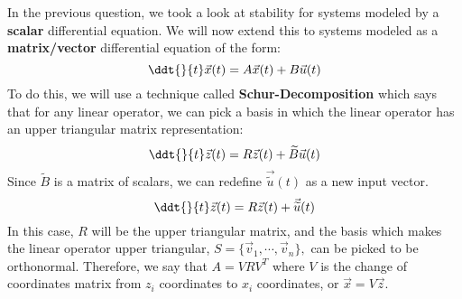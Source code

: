 

In the previous question, we took a look at stability for systems modeled by a \textbf{scalar} differential equation. 
We will now extend this to systems modeled as a \textbf{matrix/vector} differential equation of the form:
\begin{equation}\label{eqn:std}
  \ddt{}{t} \vec{x}(t) = A \vec{x}(t) + B \vec{u}(t)
\end{equation}
To do this, we will use a technique called \textbf{Schur-Decomposition} which says that for any linear operator, we can pick a basis in which the linear operator has an upper triangular matrix representation:
\begin{equation}\label{eqn:schur}
  \ddt{}{t} \vec{z}(t) = R \vec{z}(t) + \widetilde{B} \vec{u}(t)
\end{equation}
Since $\widetilde{B}$ is a matrix of scalars, we can redefine $\vec{\widetilde{{u}}}(t)$ as a new input vector.
\begin{equation}\label{eqn:input}
  \ddt{}{t} \vec{z}(t) = R \vec{z}(t) + \vec{\widetilde{{u}}}(t)
\end{equation}
In this case, $R$ will be the upper triangular matrix, and the basis which makes the linear operator upper triangular, $S = \{ \vec{v}_{1}, \cdots, \vec{v}_{n} \},$ can be picked to be orthonormal. Therefore, we say that $A = VRV^{T}$ where $V$ is the change of coordinates matrix from $z_{i}$ coordinates to $x_{i}$ coordinates, or $\vec{x} = V \vec{z}.$

